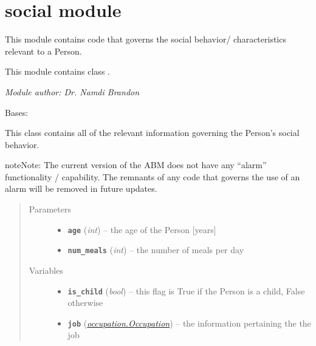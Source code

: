 \documentclass[letterpaper,10pt,english]{sphinxmanual}
\begin{document}
\section{social module}
\label{social::doc}\label{social:module-social}\label{social:social-module}
This module contains code that governs the social behavior/ characteristics relevant to a Person.

This module contains class {\hyperref[social:social.Social]{\emph{}}}.

\emph{Module author: Dr. Namdi Brandon}

\begin{fulllineitems}
\label{social:social.Social}
Bases: 

This class contains all of the relevant information governing the Person's     social behavior.

\begin{notice}{note}{Note:}
The current version of the ABM does not have any ``alarm'' functionality / capability. The remnants of any         code that governs the use of an alarm  will be removed in future updates.
\end{notice}
\begin{quote}\begin{description}
\item[{Parameters}] \leavevmode\begin{itemize}
\item {} 
\textbf{\texttt{age}} (\emph{int}) -- the age of the Person {[}years{]}

\item {} 
\textbf{\texttt{num\_meals}} (\emph{int}) -- the number of meals per day

\end{itemize}

\item[{Variables}] \leavevmode\begin{itemize}
\item {} 
\textbf{\texttt{is\_child}} (\emph{bool}) -- this flag is True if the Person is a child, False otherwise

\item {} 
\textbf{\texttt{job}} ({\hyperref[occupation:occupation.Occupation]{\emph{\emph{occupation.Occupation}}}}) -- the information pertaining the the job


\end{itemize}
\end{description}
\end{quote}
\end{fulllineitems}
\end{document}
